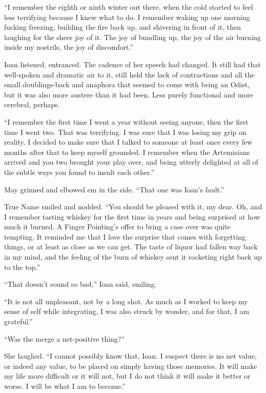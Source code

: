 ``I remember the eighth or ninth winter out there, when the cold started to feel less terrifying because I knew what to do. I remember waking up one morning fucking freezing, building the fire back up, and shivering in front of it, then laughing for the sheer joy of it. The joy of bundling up, the joy of the air burning inside my nostrils, the joy of discomfort.''

Ioan listened, entranced. The cadence of her speech had changed. It still had that well-spoken and dramatic air to it, still held the lack of contractions and all the small doublings-back and anaphora that seemed to come with being an Odist, but it was also more austere than it had been. Less purely functional and more cerebral, perhaps.

``I remember the first time I went a year without seeing anyone, then the first time I went two. That was terrifying. I was sure that I was losing my grip on reality. I decided to make sure that I talked to someone at least once every few months after that to keep myself grounded. I remember when the Artemisians arrived and you two brought your play over, and being utterly delighted at all of the subtle ways you found to insult each other.''

May grinned and elbowed em in the side. ``That one was Ioan's fault.''

True Name smiled and nodded. ``You should be pleased with it, my dear. Oh, and I remember tasting whiskey for the first time in years and being surprised at how much it burned. A Finger Pointing's offer to bring a case over was quite tempting. It reminded me that I love the surprise that comes with forgetting things, or at least as close as we can get. The taste of liquor had fallen way back in my mind, and the feeling of the burn of whiskey sent it rocketing right back up to the top.''

``That doesn't sound so bad,'' Ioan said, smiling.

``It is not all unpleasant, not by a long shot. As much as I worked to keep my sense of self while integrating, I was also struck by wonder, and for that, I am grateful.''

``Was the merge a net-positive thing?''

She laughed. ``I cannot possibly know that, Ioan. I suspect there is no net value, or indeed any value, to be placed on simply having those memories. It will make my life more difficult or it will not, but I do not think it will make it better or worse. I will be what I am to become.''

